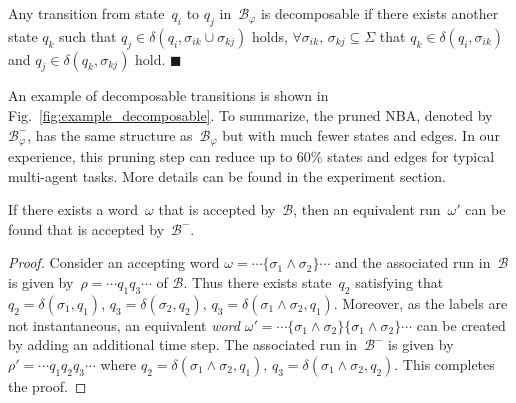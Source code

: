 \begin{definition}\label{def:decomposable-transition}
Any transition from state~$q_i$ to $q_j$ in~$\mathcal{B}_{\varphi}$ is decomposable if there exists another state $q_k$ such that $q_j\in \delta(q_i,\sigma_{ik}\cup\sigma_{kj})$ holds,
$\forall \sigma_{ik},\,\sigma_{kj} \subseteq \Sigma$ that $q_k\in \delta(q_i,\sigma_{ik})$ and $q_j\in \delta(q_k,\sigma_{kj})$ hold.
\hfill $\blacksquare$
\end{definition}

An example of decomposable transitions is shown in Fig.~\ref{fig:example_decomposable}.
To summarize, the pruned NBA, denoted by~$\mathcal{B}^{-}_{\varphi}$,
has the same structure as~$\mathcal{B}_{\varphi}$ but with much fewer states and edges.
In our experience, this pruning step can reduce up to $60\%$ states and edges for typical multi-agent tasks.
More details can be found in the experiment section. 
\begin{lemma}
  If there exists a word~$\omega$ that is accepted by~$\mathcal{B}$,
  then an equivalent run~$\omega'$ can be found that is accepted by~$\mathcal{B}^-$.
\end{lemma}
\begin{proof}
  Consider an accepting word $\omega=\cdots\{\sigma_1\land\sigma_2\}\cdots$
  and the associated run in~$\mathcal{B}$ is given by~$\rho=\cdots q_1 q_3\cdots$ of $\mathcal{B}$.
  Thus there exists state~$q_2$ satisfying that 
  $q_2=\delta(\sigma_1,q_1)$, $q_3=\delta(\sigma_2,q_2)$, $q_3=\delta(\sigma_1\land\sigma_2,q_1)$.
  Moreover, as the labels are not instantaneous, 
  an equivalent \emph{word} $\omega'=\cdots\{\sigma_1\land\sigma_2\}\{\sigma_1\land\sigma_2\}\cdots$
  can be created by adding an additional time step.
  The associated run in~$\mathcal{B}^-$ is given by~$\rho'=\cdots q_1 q_2 q_3\cdots$ where
  $q_2=\delta(\sigma_1\land\sigma_2,q_1)$, $q_3=\delta(\sigma_1\land\sigma_2,q_2)$.
  This completes the proof.
\end{proof}






